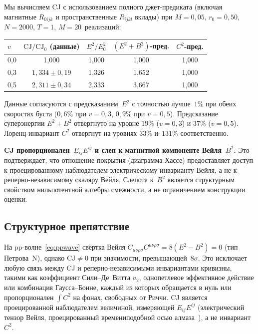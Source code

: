 \documentclass[12pt,a4paper]{article}
\theoremstyle{plain}
\theoremstyle{definition}
\theoremstyle{remark}
\newcommand{\Esq}{E_{ij}E^{ij}}
\newcommand{\CJ}{\mathrm{CJ}}
\begin{document}
Мы вычисляем CJ с использованием полного джет-предиката
(включая магнитные $R_{0ijk}$ и пространственные
$R_{ijkl}$ вклады) при $M = 0{,}05$, $r_0 = 0{,}50$,
$N = 2000$, $T = 1$, $M = 20$~реализаций:

\begin{center}
\begin{tabular}{lcccc}
\toprule
$v$ & $\CJ/\CJ_0$ (данные) & $E^2/E^2_0$ & $(E^2{+}B^2)$-пред. & $C^2$-пред. \\
\midrule
0,0 & 1,000 & 1,000 & 1,000 & 1,000 \\
0,3 & $1{,}334 \pm 0{,}19$ & 1,326 & 1,652 & 1,000 \\
0,5 & $2{,}311 \pm 0{,}34$ & 2,333 & 3,667 & 1,000 \\
\bottomrule
\end{tabular}
\end{center}

Данные согласуются с предсказанием~$E^2$ с точностью лучше~$1\%$
при обеих скоростях буста ($0{,}6\%$ при $v = 0{,}3$, $0{,}9\%$
при $v = 0{,}5$).  Предсказание суперэнергии $E^2 + B^2$
отвергнуто на уровне $19\%$ ($v = 0{,}3$) и $37\%$ ($v = 0{,}5$).
Лоренц-инвариант $C^2$ отвергнут на уровнях $33\%$
и~$131\%$ соответственно.

\textbf{CJ пропорционален~$\Esq$ и слеп к магнитной компоненте
Вейля~$B^2$.}  Это подтверждает, что отношение покрытия
(диаграмма Хассе) предоставляет доступ к проецированному
наблюдателем электрическому инварианту Вейля, а не к
реперно-независимому скаляру Вейля.  Слепота к~$B^2$ является
структурным свойством нильпотентной алгебры смежности, а не
ограничением конструкции оценки.

\subsection{Структурное препятствие}
\label{sec:obstruction}

На pp-волне~\eqref{eq:ppwave} свёртка Вейля
$C_{\mu\nu\rho\sigma} C^{\mu\nu\rho\sigma} =
8(E^2 - B^2) = 0$ (тип Петрова~N), однако $\CJ \neq 0$
при значимости, превышающей~$8\sigma$.  Это исключает любую
связь между CJ и реперно-независимыми инвариантами кривизны,
такими как коэффициент Сили--Де~Витта $a_2$, однопетлевое
эффективное действие или комбинация Гаусса--Бонне, каждый
из которых обращается в нуль или пропорционален $\int C^2$
на фонах, свободных от Риччи.  CJ является проецированной
наблюдателем величиной, измеряющей $\Esq$ (электрический
тензор Вейля, проецированный времениподобной осью
алмаза~\cite{Ehlers:1961,PenroseRindler:1984}), а не
инвариант $C^2$.
\end{document}
